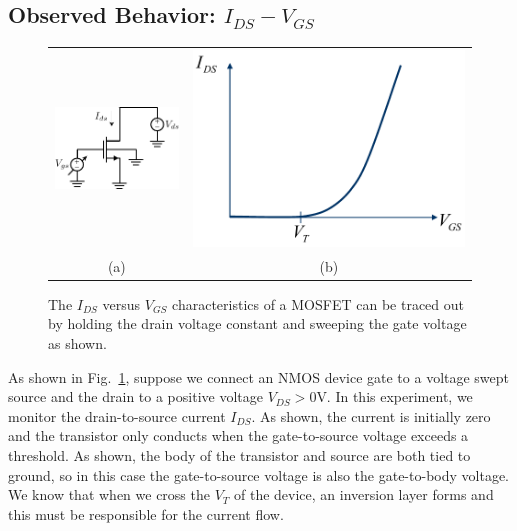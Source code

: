 \subsection{Observed Behavior: $I_{DS} - V_{GS}$}



\begin{figure}[tb]
\begin{center}
\begin{tabular}{cc}
\includegraphics[width=.35\columnwidth]{idvgs_sweep} &
\includegraphics[width=.55\columnwidth]{mos_ids_vgs} \\
(a) & (b) \\
\end{tabular}
\end{center}
\caption{The $I_{DS}$ versus $V_{GS}$ characteristics of a MOSFET can be traced out by holding the drain voltage constant and sweeping the gate voltage as shown.  } \label{fig:idvgs_sweep}
\end{figure}


As shown in Fig.~\ref{fig:idvgs_sweep}, suppose we connect an NMOS device gate to a voltage swept source and the drain to a positive voltage $V_{DS} > 0$V.  In this experiment, we monitor the drain-to-source current $I_{DS}$.  As shown, the current is initially zero and the transistor only conducts when the gate-to-source voltage exceeds a threshold.  As shown, the body of the transistor and source are both tied to ground, so in this case the gate-to-source voltage is also the gate-to-body voltage.  We know that when we cross the $V_T$ of the device, an inversion layer forms and this must be responsible for the current flow.

